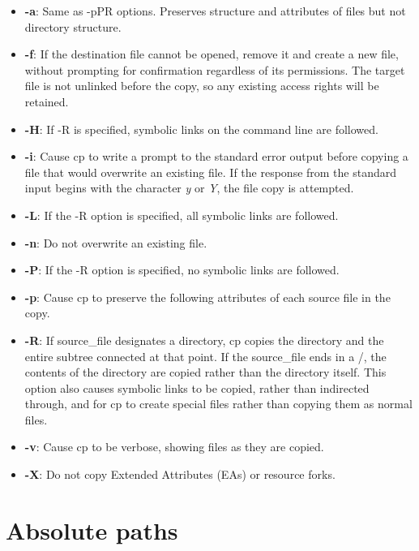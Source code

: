 \documentclass[hidelinks,12pt,a4paper,numbers=enddot]{scrartcl}
\begin{document}
\begin{itemize}
    \item \textbf{-a}: Same as -pPR options. Preserves structure and attributes of files
        but not directory structure.
    
    \item \textbf{-f}: If the destination file cannot be opened, remove it and create a new file,
        without prompting for confirmation regardless of its permissions.
        The target file is not unlinked before the copy,
        so any existing access rights will be retained.
    
    \item \textbf{-H}: If -R is specified, symbolic links on the command line are followed.
    \item \textbf{-i}: Cause cp to write a prompt to the standard error output before
        copying a file that would overwrite an existing file. If the
        response from the standard input begins with the character \emph{y} or
        \emph{Y}, the file copy is attempted.
    
    \item \textbf{-L}: If the -R option is specified, all symbolic links are followed.
    \item \textbf{-n}: Do not overwrite an existing file.
    \item \textbf{-P}: If the -R option is specified, no symbolic links are followed.
    \item \textbf{-p}: Cause cp to preserve the following attributes of each source file
        in the copy.
    
    \item \textbf{-R}: If source\_file designates a directory, cp copies the directory and
        the entire subtree connected at that point. If the source\_file
        ends in a /, the contents of the directory are copied rather than
        the directory itself.  This option also causes symbolic links to be
        copied, rather than indirected through, and for cp to create special files
        rather than copying them as normal files.
    
    \item \textbf{-v}: Cause cp to be verbose, showing files as they are copied.
    \item \textbf{-X}: Do not copy Extended Attributes (EAs) or resource forks.
\end{itemize}

\section{Absolute paths}
\end{document}
